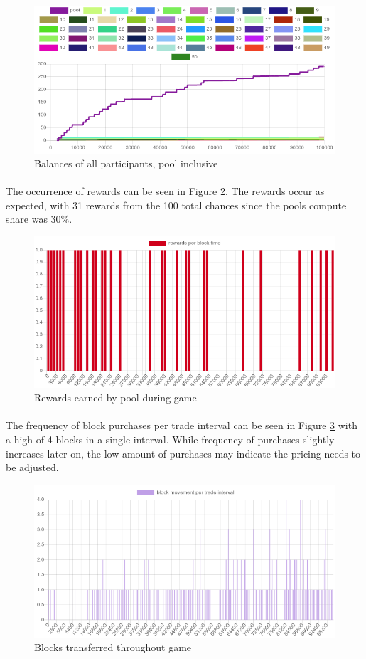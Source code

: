 \begin{figure}[H]
  \centering
  \caption{Balances of all participants, pool inclusive}
  \label{figure:balances-pool}
  \includegraphics[width=\linewidth]{media/fig-balances-pool}
\end{figure}

\paragraph{} The occurrence of rewards can be seen in Figure \ref{figure:rewards}. The rewards occur as expected, with 31 rewards from the 100 total chances since the pools compute share was 30\%.

\begin{figure}[H]
  \centering
  \caption{Rewards earned by pool during game}
  \label{figure:rewards}
  \includegraphics[width=\linewidth]{media/fig-rewards}
\end{figure}

\paragraph{} The frequency of block purchases per trade interval can be seen in Figure \ref{figure:blocks} with a high of 4 blocks in a single interval. While frequency of purchases slightly increases later on, the low amount of purchases may indicate the pricing needs to be adjusted.

\begin{figure}[H]
  \centering
  \caption{Blocks transferred throughout game}
  \label{figure:blocks}
  \includegraphics[width=\linewidth]{media/fig-blocks}
\end{figure}